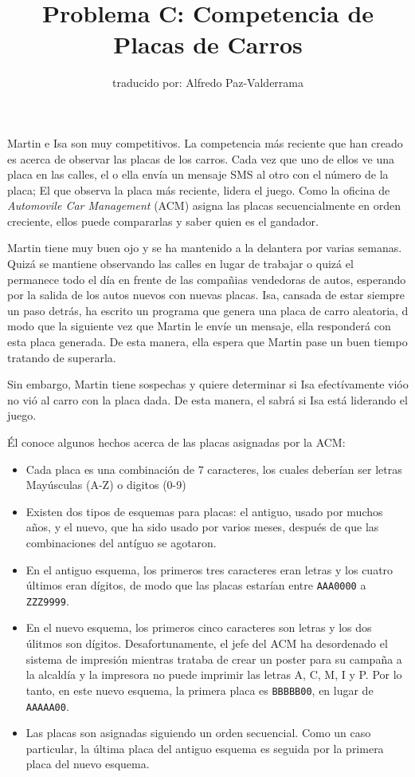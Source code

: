 \documentclass[a4paper,12pt]{article}
\title{Problema C: Competencia de Placas de Carros}
\author{traducido por: Alfredo Paz-Valderrama}
\date{}
\begin{document}
\maketitle
Martin e Isa son muy competitivos. La competencia más reciente que han creado es acerca de observar las placas de los carros. Cada vez que uno de ellos ve una placa en las calles, el o ella envía un mensaje SMS al otro con el número de la placa; El que observa la placa más reciente, lidera el juego. Como la oficina de \emph{Automovile Car Management} (ACM) asigna las placas secuencialmente en orden creciente, ellos puede compararlas y saber quien es el gandador.

Martin tiene muy buen ojo y se ha mantenido a la delantera por varias semanas.  Quizá se mantiene observando las calles en lugar de trabajar o quizá el permanece todo el día en frente de las compañias vendedoras de autos, esperando por la salida de los autos nuevos con nuevas placas.  Isa, cansada de estar siempre un paso detrás, ha escrito un programa que genera una placa de carro aleatoria, d modo que la siguiente vez que Martin le envíe un mensaje, ella responderá con esta placa generada. De esta manera, ella espera que Martin pase un buen tiempo tratando de superarla.

Sin embargo, Martin tiene sospechas y quiere determinar si Isa efectívamente vióo no vió al carro con la placa dada. De esta manera, el sabrá si Isa está liderando el juego.

Él conoce algunos hechos acerca de las placas asignadas por la ACM:

\begin{itemize}
   \item Cada placa es una combinación de 7 caracteres, los cuales deberían ser letras Mayúsculas (A-Z) o digitos (0-9)
   \item Existen dos tipos de esquemas para placas: el antiguo, usado por muchos años, y el nuevo, que ha sido usado por varios meses, después de que las combinaciones del antíguo se agotaron.
  \item En el antiguo esquema, los primeros tres caracteres eran letras y los cuatro últimos eran dígitos, de modo que las placas estarían entre \verb|AAA0000| a \verb|ZZZ9999|.
  \item En el nuevo esquema, los primeros cinco caracteres son letras y los dos úlitmos son dígitos. Desafortunamente, el jefe del ACM ha desordenado el sistema de impresión mientras trataba de crear un poster para su campaña a la alcaldía y la impresora no puede imprimir las letras A, C, M, I y P. Por lo tanto, en este nuevo esquema, la primera placa es \verb|BBBBB00|, en lugar de \verb|AAAAA00|.
  \item Las placas son asignadas siguiendo un orden secuencial. Como un caso particular, la última placa del antiguo esquema es seguida por la primera placa del nuevo esquema.
\end{itemize}
\end{document}

